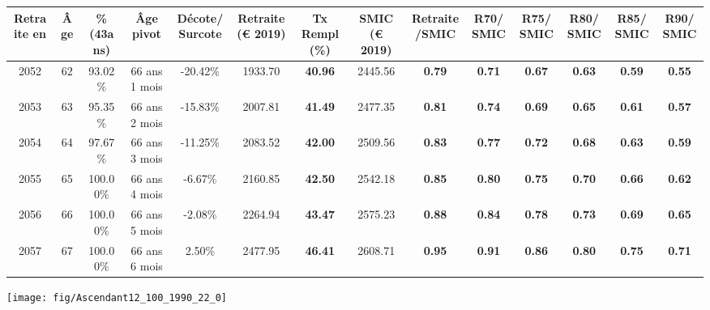 \begin{adjustbox}{max width=\textwidth} 
\begin{tabular}[htb]{|c|c||c|c|c||c|c||c|c||c|c|c|c|c|} 
\hline 
 Retraite en &  Âge &  \%(43ans) &  Âge pivot &  Décote/Surcote &  Retraite (\euro{} 2019) &  Tx Rempl(\%) &  SMIC (\euro{} 2019) &  Retraite/SMIC &  R70/SMIC &  R75/SMIC &  R80/SMIC &  R85/SMIC &  R90/SMIC \\ 
\hline \hline 
 2052 &  62 &  93.02\% &  66 ans 1 mois &  -20.42\% &  1933.70 &  {\bf 40.96} &  2445.56 &  {\bf {\color{red} 0.79}} &  {\bf {\color{red} 0.71}} &  {\bf {\color{red} 0.67}} &  {\bf {\color{red} 0.63}} &  {\bf {\color{red} 0.59}} &  {\bf {\color{red} 0.55}} \\ 
\hline 
 2053 &  63 &  95.35\% &  66 ans 2 mois &  -15.83\% &  2007.81 &  {\bf 41.49} &  2477.35 &  {\bf {\color{red} 0.81}} &  {\bf {\color{red} 0.74}} &  {\bf {\color{red} 0.69}} &  {\bf {\color{red} 0.65}} &  {\bf {\color{red} 0.61}} &  {\bf {\color{red} 0.57}} \\ 
\hline 
 2054 &  64 &  97.67\% &  66 ans 3 mois &  -11.25\% &  2083.52 &  {\bf 42.00} &  2509.56 &  {\bf {\color{red} 0.83}} &  {\bf {\color{red} 0.77}} &  {\bf {\color{red} 0.72}} &  {\bf {\color{red} 0.68}} &  {\bf {\color{red} 0.63}} &  {\bf {\color{red} 0.59}} \\ 
\hline 
 2055 &  65 &  100.00\% &  66 ans 4 mois &  -6.67\% &  2160.85 &  {\bf 42.50} &  2542.18 &  {\bf {\color{red} 0.85}} &  {\bf {\color{red} 0.80}} &  {\bf {\color{red} 0.75}} &  {\bf {\color{red} 0.70}} &  {\bf {\color{red} 0.66}} &  {\bf {\color{red} 0.62}} \\ 
\hline 
 2056 &  66 &  100.00\% &  66 ans 5 mois &  -2.08\% &  2264.94 &  {\bf 43.47} &  2575.23 &  {\bf {\color{red} 0.88}} &  {\bf {\color{red} 0.84}} &  {\bf {\color{red} 0.78}} &  {\bf {\color{red} 0.73}} &  {\bf {\color{red} 0.69}} &  {\bf {\color{red} 0.65}} \\ 
\hline 
 2057 &  67 &  100.00\% &  66 ans 6 mois &  2.50\% &  2477.95 &  {\bf 46.41} &  2608.71 &  {\bf {\color{red} 0.95}} &  {\bf {\color{red} 0.91}} &  {\bf {\color{red} 0.86}} &  {\bf {\color{red} 0.80}} &  {\bf {\color{red} 0.75}} &  {\bf {\color{red} 0.71}} \\ 
\hline 
\hline 
\end{tabular} 
\end{adjustbox} 
 
 \vspace{0.1cm} 

 {\hspace{-2.2cm}\texttt{[image: fig/Ascendant12\_100\_1990\_22\_0]}} 

